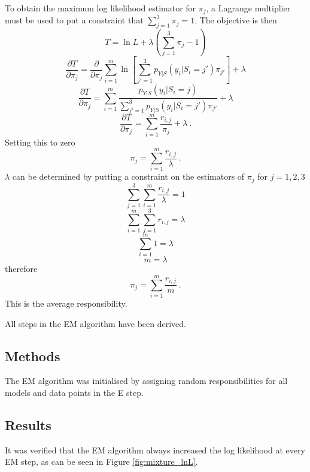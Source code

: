 \documentclass[12pt]{report}
\begin{document}
To obtain the maximum log likelihood estimator for $\pi_j$, a Lagrange multiplier must be used to put a constraint that $\sum_{j=1}^3\pi_j=1$. The objective is then
\begin{equation}
T = \ln{L} + \lambda\left(\sum_{j=1}^3\pi_j-1\right)
\end{equation}
\begin{equation}
\frac{\partial T}{\partial\pi_j}=\frac{\partial}{\partial\pi_j}\sum_{i=1}^m\ln\left[
\sum_{j'=1}^3p_{Y|S}\left(y_i|S_i=j'\right)\pi_{j'}
\right] + \lambda
\end{equation}
\begin{equation}
\frac{\partial T}{\partial\pi_j}=\sum_{i=1}^m\frac{p_{Y|S}\left(y_i|S_i=j\right)}{\sum_{j'=1}^3p_{Y|S}\left(y_i|S_i=j'\right)\pi_{j'}} + \lambda
\end{equation}
\begin{equation}
\frac{\partial T}{\partial\pi_j}=\sum_{i=1}^m\frac{r_{i,j}}{\pi_j} + \lambda \ .
\end{equation}
Setting this to zero
\begin{equation}
\pi_j = \sum_{i=1}^m\frac{r_{i,j}}{\lambda} \ .
\end{equation}
$\lambda$ can be determined by putting a constraint on the estimators of $\pi_j$ for $j=1,2,3$
\begin{equation}
\sum_{j=1}^3\sum_{i=1}^m\frac{r_{i,j}}{\lambda}=1
\end{equation}
\begin{equation}
\sum_{i=1}^m\sum_{j=1}^3r_{i,j}=\lambda
\end{equation}
\begin{equation}
\sum_{i=1}^m1=\lambda
\end{equation}
\begin{equation}
m=\lambda
\end{equation}
therefore
\begin{equation}
\pi_j = \sum_{i=1}^m\frac{r_{i,j}}{m} \ .
\end{equation}
This is the average responsibility.

All steps in the EM algorithm have been derived.

\subsection{Methods}
The EM algorithm was initialised by assigning random responsibilities for all models and data points in the E step.

\subsection{Results}
It was verified that the EM algorithm always increased the log likelihood at every EM step, as can be seen in Figure \ref{fig:mixture_lnL}.
\end{document}
